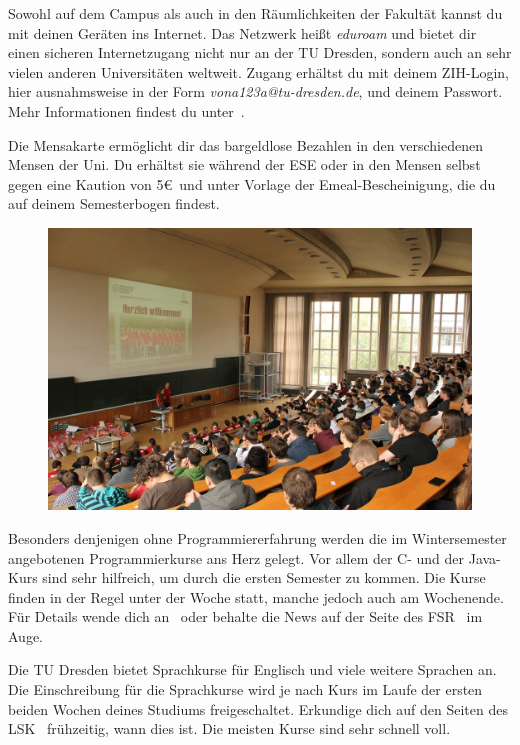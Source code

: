 \begin{itemize}[leftmargin=*]
Sowohl auf dem Campus als auch in den Räumlichkeiten der Fakultät kannst du mit
deinen Geräten ins Internet. Das Netzwerk heißt \textit{eduroam} und bietet dir
einen sicheren Internetzugang nicht nur an der TU Dresden, sondern auch an sehr
vielen anderen Universitäten weltweit. Zugang erhältst du mit deinem ZIH-Login,
hier ausnahmsweise in der Form \textit{vona123a@tu-dresden.de}, und deinem
Passwort. Mehr Informationen findest du unter~.

Die Mensakarte ermöglicht dir das bargeldlose Bezahlen in den verschiedenen
Mensen der Uni. Du erhältst sie während der ESE oder in den Mensen selbst gegen
eine Kaution von 5\euro\ und unter Vorlage der Emeal-Bescheinigung, die du auf
deinem Semesterbogen findest.

\begin{figure}[b!]
\centering
\includegraphics[width=.99\linewidth]{img/ese2013/barschoe.jpg}
\end{figure}

Besonders denjenigen ohne Programmiererfahrung werden die im Wintersemester
angebotenen Programmierkurse ans Herz gelegt. Vor allem der C- und der Java-Kurs
sind sehr hilfreich, um durch die ersten Semester zu kommen. Die Kurse finden in
der Regel unter der Woche statt, manche jedoch auch am Wochenende. Für Details
wende dich an~ oder behalte die News auf der
Seite des FSR~ im Auge.

Die TU Dresden bietet Sprachkurse für Englisch und viele weitere Sprachen an.
Die Einschreibung für die Sprachkurse wird je nach Kurs im Laufe der ersten
beiden Wochen deines Studiums freigeschaltet. Erkundige dich auf den Seiten des
LSK~ frühzeitig, wann dies ist. Die
meisten Kurse sind sehr schnell voll.


\end{itemize}
